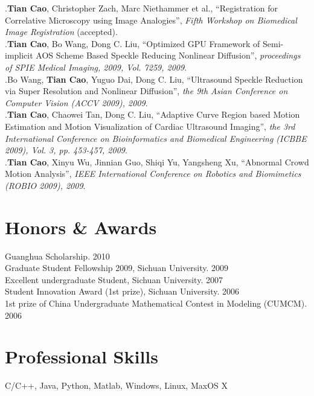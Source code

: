 \documentclass[line,margin]{res}
\begin{document}
\begin{resume}
[1].\textbf{Tian Cao}, Christopher Zach, Marc Niethammer et al., ``Registration for Correlative Microscopy using Image Analogies'',  \emph{Fifth Workshop on Biomedical Image Registration} (accepted).\vspace{.1in}\\
\smallskip
[2].\textbf{Tian Cao}, Bo Wang, Dong C. Liu, ``Optimized GPU Framework of Semi-implicit AOS
Scheme Based Speckle Reducing Nonlinear Diﬀusion'',  \emph{proceedings of SPIE Medical Imaging, 2009, Vol. 7259, 2009}.\vspace{.1in}\\
\smallskip
[3].Bo Wang, \textbf{Tian Cao}, Yuguo Dai, Dong C. Liu, ``Ultrasound Speckle Reduction via Super Resolution and Nonlinear Diffusion'',  \emph{the 9th Asian Conference on Computer Vision (ACCV 2009), 2009}. \vspace{.1in}\\
\smallskip
[4].\textbf{Tian Cao}, Chaowei Tan, Dong C. Liu, ``Adaptive Curve Region based Motion Estimation and Motion Visualization of Cardiac Ultrasound Imaging'',  \emph{the 3rd International Conference on Bioinformatics and Biomedical Engineering (ICBBE 2009), Vol. 3, pp. 453-457, 2009}.\vspace{.1in}\\
\smallskip
[5].\textbf{Tian Cao}, Xinyu Wu, Jinnian Guo, Shiqi Yu, Yangsheng Xu, ``Abnormal Crowd Motion Analysis'', \emph{IEEE International Conference on Robotics and Biomimetics (ROBIO 2009), 2009}.

 
\section{\sc Honors \& Awards}
\smallskip


Guanghua Scholarship.  \hfill       2010\vspace{.1in}\\
Graduate Student Fellowship 2009, Sichuan University.  \hfill       2009\vspace{.1in}\\
Excellent undergraduate Student, Sichuan University.  \hfill       2007\vspace{.1in}\\
Student Innovation Award (1st prize), Sichuan University.  \hfill       2006\vspace{.1in}\\
1st prize of China Undergraduate Mathematical Contest in Modeling (CUMCM).  \hfill       2006

\section{\sc Professional Skills}
\smallskip

C/C++, Java, Python, Matlab, Windows, Linux, MaxOS X

\end{resume}

%
%
\end{document}
